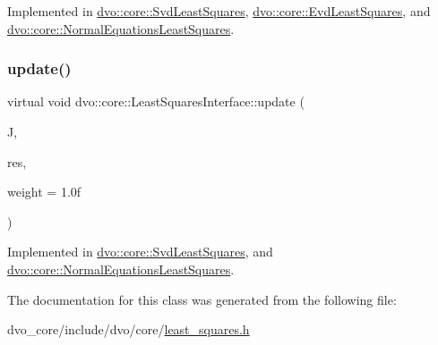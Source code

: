 Implemented in \mbox{\hyperlink{classdvo_1_1core_1_1_svd_least_squares_ae0124d7c24b90b1101bf38da59f789aa}{dvo\+::core\+::\+Svd\+Least\+Squares}}, \mbox{\hyperlink{classdvo_1_1core_1_1_evd_least_squares_a7264139b3006d803039707c4318d2451}{dvo\+::core\+::\+Evd\+Least\+Squares}}, and \mbox{\hyperlink{classdvo_1_1core_1_1_normal_equations_least_squares_a8a25d3970f6506df2066995f2f2effda}{dvo\+::core\+::\+Normal\+Equations\+Least\+Squares}}.

\mbox{\label{classdvo_1_1core_1_1_least_squares_interface_a5f5cc1c312a01ff4e7ca91e90a73ccf3}} 
\subsubsection{\texorpdfstring{update()}{update()}}
{\footnotesize\ttfamily virtual void dvo\+::core\+::\+Least\+Squares\+Interface\+::update (\begin{DoxyParamCaption}\item[{const \mbox{\hyperlink{namespacedvo_1_1core_a05327f3312d32a301bce9fccda9e5807}{Vector6}} \&}]{J,  }\item[{const \mbox{\hyperlink{namespacedvo_1_1core_ab9c199d221775a923e2549ad7e15c323}{Num\+Type}} \&}]{res,  }\item[{const \mbox{\hyperlink{namespacedvo_1_1core_ab9c199d221775a923e2549ad7e15c323}{Num\+Type}} \&}]{weight = {\ttfamily 1.0f} }\end{DoxyParamCaption})\hspace{0.3cm}{\ttfamily [pure virtual]}}



Implemented in \mbox{\hyperlink{classdvo_1_1core_1_1_svd_least_squares_ae9d28bc58804d7e43cf461ca092b9563}{dvo\+::core\+::\+Svd\+Least\+Squares}}, and \mbox{\hyperlink{classdvo_1_1core_1_1_normal_equations_least_squares_a1ef767b22d889c99850b1b2dd8cd870d}{dvo\+::core\+::\+Normal\+Equations\+Least\+Squares}}.



The documentation for this class was generated from the following file\+:\begin{DoxyCompactItemize}
\item 
dvo\+\_\+core/include/dvo/core/\mbox{\hyperlink{least__squares_8h}{least\+\_\+squares.\+h}}\end{DoxyCompactItemize}
